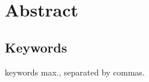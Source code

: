 \chapter*{Abstract}

\section*{\tituloPortadaEngVal}

\lipsum[1]


\section*{Keywords}

 keywords max., separated by commas.



